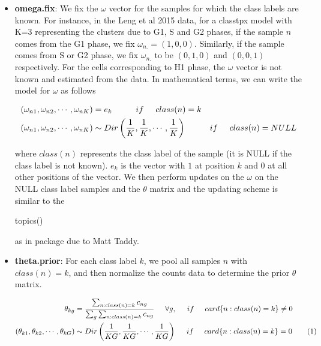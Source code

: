 \documentclass[12pt]{article}\usepackage[]{graphicx}\usepackage[usenames,dvipsnames]{color}
\newcommand\numberthis{\addtocounter{equation}{1}\tag{\theequation}}
\begin{document}
\begin{itemize}

\item \textbf{omega.fix}: We fix the $\omega$ vector for the samples for which the class labels are known. For instance, in the Leng et al 2015 data, for a classtpx model with K=3 representing the clusters due to G1, S and G2 phases, if the sample $n$ comes from the G1 phase, we fix $\omega_{n.} = (1,0,0)$. Similarly, if the sample comes from S or G2 phase, we fix $\omega_{n.}$ to be $(0,1,0)$ and $(0,0,1)$ respectively. For the cells corresponding to H1 phase, the $\omega$ vector is not known and estimated from the data. In mathematical terms, we can write the model for $\omega$ as follows 

\begin{align*}
\left(\omega_{n1}, \omega_{n2}, \cdots, \omega_{nK} \right) & = e_{k} \hspace{1 cm} if \hspace{0.5 cm} class(n) = k  \\
\left(\omega_{n1}, \omega_{n2}, \cdots, \omega_{nK} \right) & \sim Dir \left ( \frac{1}{K}, \frac{1}{K}, \cdots, \frac{1}{K} \right) \hspace{1 cm} if \hspace{0.5 cm} class(n) = NULL \\
\end{align*}

where $class(n)$ represents the class label of the sample (it is NULL if the class label is not known). $e_{k}$ is the vector with $1$ at position $k$ and $0$ at all other positions of the vector. We then perform updates on the $\omega$ on the NULL class label samples and the $\theta$ matrix and the updating scheme is similar to the \begin{verb} topics() \end{verb} as in  package due to Matt Taddy.

\item \textbf{theta.prior}: For each class label $k$, we pool all samples $n$ with $class(n)=k$, and then normalize the counts data to determine the prior $\theta$ matrix.

\begin{align*}
\theta_{kg} & = \frac{\sum_{n:class(n)=k} c_{ng}}{\sum_{g} \sum_{n:class(n)=k} c_{ng}} \hspace{0.5 cm} \forall g,  \hspace{0.5 cm} if \hspace{0.5 cm} card \{n: class(n)=k \} \neq 0 \nonumber \\
\left(\theta_{k1}, \theta_{k2}, \cdots, \theta_{kG} \right) & \sim Dir \left ( \frac{1}{KG}, \frac{1}{KG}, \cdots, \frac{1}{KG} \right) \hspace{0.5 cm} if \hspace{0.5 cm} card \{n: class(n)=k \}= 0  \numberthis \label{eq:eq1} \\
\end{align*}


\end{itemize}
\end{document}
